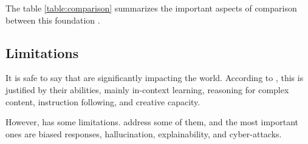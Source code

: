 The table \ref{table:comparison} summarizes the important aspects of comparison between this foundation {\llm}.

\begin{table}[ht]
    \caption{Comparison of foundation Large Language Models.}
    \label{table:comparison}
\end{table}



\subsection{Limitations}

It is safe to say that {\llm} are significantly impacting the world. According to \citet{liu_prompting_nodate}, this is justified by their abilities, mainly in-context learning, reasoning for complex content, instruction following, and creative capacity.

However, {\llm} has some limitations. \citet{hadi_LLM_2023} address some of them, and the most important ones are biased responses, hallucination, explainability, and cyber-attacks. 

